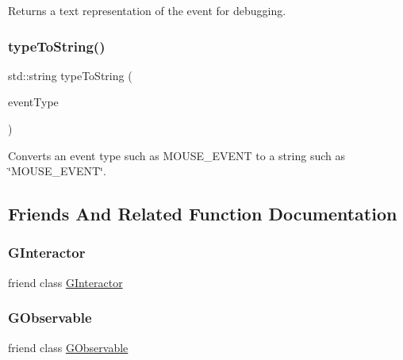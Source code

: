 Returns a text representation of the event for debugging. 

\mbox{\label{classGEvent_abfc45737c7f2e261401203a0c959c103}} 
\subsubsection{\texorpdfstring{type\+To\+String()}{typeToString()}}
{\footnotesize\ttfamily std\+::string type\+To\+String (\begin{DoxyParamCaption}\item[{Event\+Type}]{event\+Type }\end{DoxyParamCaption})\hspace{0.3cm}{\ttfamily [static]}}



Converts an event type such as M\+O\+U\+S\+E\+\_\+\+E\+V\+E\+NT to a string such as \char`\"{}\+M\+O\+U\+S\+E\+\_\+\+E\+V\+E\+N\+T\char`\"{}. 



\subsection{Friends And Related Function Documentation}
\mbox{\label{classGEvent_a054e99eaa992da5c1a77c8d7b3817788}} 
\subsubsection{\texorpdfstring{G\+Interactor}{GInteractor}}
{\footnotesize\ttfamily friend class \mbox{\hyperlink{classGInteractor}{G\+Interactor}}\hspace{0.3cm}{\ttfamily [friend]}}

\mbox{\label{classGEvent_ab2c4a87c15be41d9bef82e78272b6a70}} 
\subsubsection{\texorpdfstring{G\+Observable}{GObservable}}
{\footnotesize\ttfamily friend class \mbox{\hyperlink{classGObservable}{G\+Observable}}\hspace{0.3cm}{\ttfamily [friend]}}




